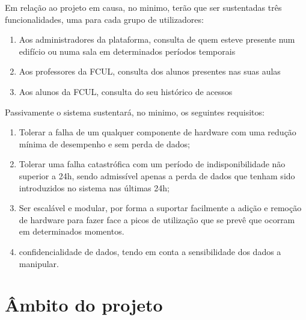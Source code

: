 \documentclass[a4paper]{report}
\begin{document}
Em relação ao projeto em causa, no minimo, terão que ser sustentadas três funcionalidades, uma para cada grupo de utilizadores:
\begin{enumerate}
\item Aos administradores da plataforma, consulta de quem esteve presente num edifício ou numa sala em determinados períodos temporais %
\item Aos professores da FCUL, consulta dos alunos presentes nas suas aulas
\item Aos alunos da FCUL, consulta do seu histórico de acessos
\end{enumerate}

Passivamente o sistema sustentará, no minimo, os seguintes requisitos:
\begin{enumerate}
\item Tolerar a falha de um qualquer componente de hardware com uma redução mínima de desempenho e sem perda de dados;
\item Tolerar uma falha catastrófica com um período de indisponibilidade não superior a 24h, sendo admissível apenas a perda de dados que tenham sido introduzidos no sistema nas últimas 24h;
\item Ser escalável e modular, por forma a suportar facilmente a adição e remoção de hardware para fazer face a picos de utilização que se prevê que ocorram em determinados momentos.
\item confidencialidade de dados, tendo em conta a sensibilidade dos dados a manipular.
\end{enumerate}
\chapter{Âmbito do projeto}
\end{document}
